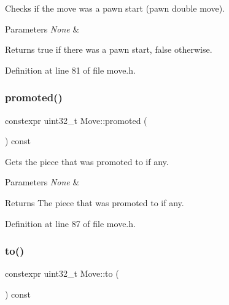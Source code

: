 Checks if the move was a pawn start (pawn double move). 


\begin{DoxyParams}{Parameters}
{\em None} & \\
\hline
\end{DoxyParams}
\begin{DoxyReturn}{Returns}
true if there was a pawn start, false otherwise. 
\end{DoxyReturn}


Definition at line 81 of file move.\+h.

\mbox{\label{classMove_a68741632b4a38ae64152541ed3c641ae}} 
\subsubsection{\texorpdfstring{promoted()}{promoted()}}
{\footnotesize\ttfamily constexpr uint32\+\_\+t Move\+::promoted (\begin{DoxyParamCaption}{ }\end{DoxyParamCaption}) const\hspace{0.3cm}{\ttfamily [inline]}}



Gets the piece that was promoted to if any. 


\begin{DoxyParams}{Parameters}
{\em None} & \\
\hline
\end{DoxyParams}
\begin{DoxyReturn}{Returns}
The piece that was promoted to if any. 
\end{DoxyReturn}


Definition at line 87 of file move.\+h.

\mbox{\label{classMove_a14f68402d1ad19b441730a7f7d703362}} 
\subsubsection{\texorpdfstring{to()}{to()}}
{\footnotesize\ttfamily constexpr uint32\+\_\+t Move\+::to (\begin{DoxyParamCaption}{ }\end{DoxyParamCaption}) const\hspace{0.3cm}{\ttfamily [inline]}}



